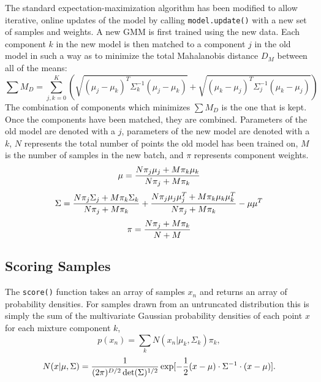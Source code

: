 \documentclass{article}
\begin{document}
The standard expectation-maximization algorithm has been modified to allow
iterative, online updates of the model by calling \texttt{model.update()} with
a new set of samples and weights. A new GMM is first trained using the new data.
Each component $k$ in the new model is then matched to a component $j$ in the old
model in such a way as to minimize the total Mahalanobis distance $D_M$ between
all of the means:
\begin{equation}
    \sum M_D = \sum_{j,k=0}^{K} (\sqrt{(\mu_j - \mu_k)^T\Sigma_k^{-1}(\mu_j - \mu_k)}
    + \sqrt{(\mu_k - \mu_j)^T\Sigma_j^{-1}(\mu_k - \mu_j)})
\end{equation}
The combination of components which minimizes $\sum M_D$ is the one that is kept. \\

Once the components have been matched, they are combined. Parameters of the old
model are denoted with a $j$, parameters of the new model are denoted with a
$k$, $N$ represents the total number of points the old model has been trained
on, $M$ is the number of samples in the new batch, and $\pi$ represents
component weights.
\begin{equation}
    \mu = {{N\pi_j\mu_j + M\pi_k\mu_k} \over {N\pi_j + M\pi_k}}
\end{equation}
\begin{equation}
    \Sigma = {{N\pi_j\Sigma_j + M\pi_k\Sigma_k} \over {N\pi_j + M\pi_k}}
    + {{N\pi_j\mu_j\mu_j^T + M\pi_k\mu_k\mu_k^T} \over {N\pi_j + M\pi_k}}
    - \mu\mu^T
\end{equation}
\begin{equation}
    \pi = {{N\pi_j + M\pi_k} \over {N + M}}
\end{equation}

\subsection{Scoring Samples}

The \texttt{score()} function takes an array of samples $x_n$ and returns an
array of probability densities. For samples drawn from an untruncated distribution
this is simply the sum of the multivariate Gaussian probability densities of each
point $x$ for each mixture component $k$,
\begin{equation}
    p(x_n) = \sum_{k} N(x_n | \mu_k, \Sigma_k)\pi_k,
\end{equation}
\begin{equation}
    N(x | \mu, \Sigma) = {1 \over {(2\pi)^{D/2} \det(\Sigma)^{1/2}}}
    \exp[-{1 \over 2} (x - \mu) \cdot \Sigma^{-1} \cdot (x - \mu)].
\end{equation}
\end{document}
